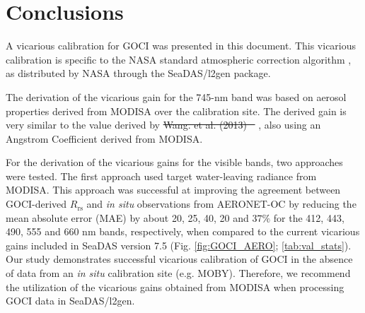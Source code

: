 \documentclass[]{interact}
\theoremstyle{plain}%
\theoremstyle{definition}
\theoremstyle{remark}
\providecommand{\DIFaddtex}[1]{{\protect\color{blue}\uwave{#1}}} %
\providecommand{\DIFdeltex}[1]{{\protect\color{red}\sout{#1}}}                      %
\providecommand{\DIFaddbegin}{} %
\providecommand{\DIFaddend}{} %
\providecommand{\DIFdelbegin}{} %
\providecommand{\DIFdelend}{} %
\providecommand{\DIFadd}[1]{\texorpdfstring{\DIFaddtex{#1}}{#1}} %
\providecommand{\DIFdel}[1]{\texorpdfstring{\DIFdeltex{#1}}{}} %
\newcommand{\DIFscaledelfig}{0.5}
\newlength{\DIFdelgraphicswidth} %
\newlength{\DIFdelgraphicsheight} %
\newcommand{\DIFaddincludegraphics}[2][]{{\color{blue}\fbox{\DIFOincludegraphics[#1]{#2}}}} %
\newcommand{\DIFdelincludegraphics}[2][]{%
\sbox{\DIFdelgraphicsbox}{\DIFOincludegraphics[#1]{#2}}%
\settoboxwidth{\DIFdelgraphicswidth}{\DIFdelgraphicsbox} %
\settoboxtotalheight{\DIFdelgraphicsheight}{\DIFdelgraphicsbox} %
\scalebox{\DIFscaledelfig}{%
\parbox[b]{\DIFdelgraphicswidth}{\usebox{\DIFdelgraphicsbox}\\[-\baselineskip] \rule{\DIFdelgraphicswidth}{0em}}\llap{\resizebox{\DIFdelgraphicswidth}{\DIFdelgraphicsheight}{%
\setlength{\unitlength}{\DIFdelgraphicswidth}%
\begin{picture}(1,1)%
\thicklines\linethickness{2pt} %
{\color[rgb]{1,0,0}\put(0,0){\framebox(1,1){}}}%
{\color[rgb]{1,0,0}\put(0,0){\line( 1,1){1}}}%
{\color[rgb]{1,0,0}\put(0,1){\line(1,-1){1}}}%
\end{picture}%
}\hspace*{3pt}}} %
} %
\DeclareRobustCommand{\DIFaddbegin}{\DIFOaddbegin \let\includegraphics\DIFaddincludegraphics} %
\DeclareRobustCommand{\DIFaddend}{\DIFOaddend \let\includegraphics\DIFOincludegraphics} %
\DeclareRobustCommand{\DIFdelbegin}{\DIFOdelbegin \let\includegraphics\DIFdelincludegraphics} %
\DeclareRobustCommand{\DIFdelend}{\DIFOaddend \let\includegraphics\DIFOincludegraphics} %
\begin{document}
\section{Conclusions}



A vicarious calibration for GOCI was presented in this document. This vicarious calibration is specific to the NASA standard atmospheric correction algorithm \citep{Mobley2016}, as distributed by NASA through the SeaDAS/l2gen package. 

The derivation of the vicarious gain for the 745-nm band was based on aerosol properties derived from MODISA over the calibration site. The derived gain is very similar to the value derived by \DIFdelbegin \DIFdel{Wang. et al. (2013) \mbox{%
\citep{Wang:13}}%
}\DIFdelend \DIFaddbegin \DIFadd{\mbox{%
\cite{Wang:13}}%
}\DIFaddend , also using an Angstrom Coefficient derived from MODISA. 

For the derivation of the vicarious gains for the visible bands, two approaches were tested. The first approach used target water-leaving radiance from MODISA. This approach was successful at improving the agreement between GOCI-derived $R_\text{rs}$ and {\it in situ} observations from AERONET-OC by reducing the mean absolute error (MAE) by about 20, 25, 40, 20 and $37\%$ for the 412, 443, 490, 555 and 660 nm bands, respectively, when compared to the current vicarious gains included in SeaDAS version 7.5 (Fig. \ref{fig:GOCI_AERO}; \autoref{tab:val_stats}). Our study demonstrates successful vicarious calibration of GOCI in the absence of data from an {\it in situ} calibration site (e.g. MOBY). Therefore, we recommend the utilization of the vicarious gains obtained from MODISA when processing GOCI data in SeaDAS/l2gen.
\end{document}
